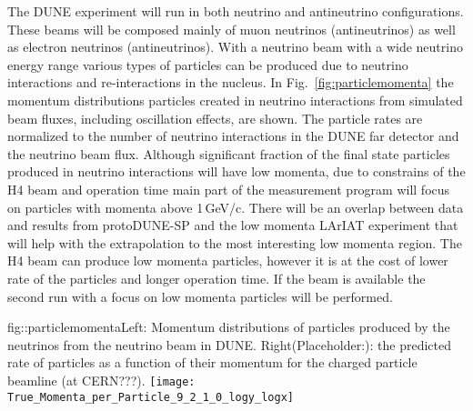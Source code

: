 The DUNE experiment will run in both neutrino and antineutrino 
configurations. These beams will be composed mainly of muon neutrinos (antineutrinos) as well as electron neutrinos (antineutrinos). With a neutrino beam with a wide neutrino energy range various types of particles can be produced due to neutrino interactions and re-interactions in the nucleus.  In Fig.~\ref{fig:particlemomenta} the momentum distributions particles created in 
neutrino interactions from simulated beam fluxes, including oscillation effects, are shown.  The particle rates are normalized  to the number of neutrino interactions in 
the DUNE far detector and the neutrino beam flux.  Although significant fraction of the final state particles produced in neutrino interactions  will have low momenta, due to constrains of the H4 beam and operation time main part of the measurement program will focus on particles with momenta above 1\,GeV/c. There will be an overlap between data and results from protoDUNE-SP and the low momenta LArIAT experiment that will help with the extrapolation to the most interesting low momenta region.  The H4 beam can produce low momenta particles, however it is at the cost of lower rate of the particles and longer operation time. If the beam is available the second run with a focus on  low momenta particles will be performed. 


\begin{cdrfigure} {fig::particlemomenta}{Left: Momentum distributions of particles produced by the neutrinos from the neutrino beam in DUNE. Right(Placeholder:): the predicted rate of particles as a function of their momentum for the charged particle beamline (at CERN???).} 
  \texttt{[image: True\_Momenta\_per\_Particle\_9\_2\_1\_0\_logy\_logx]}
\end{cdrfigure}

